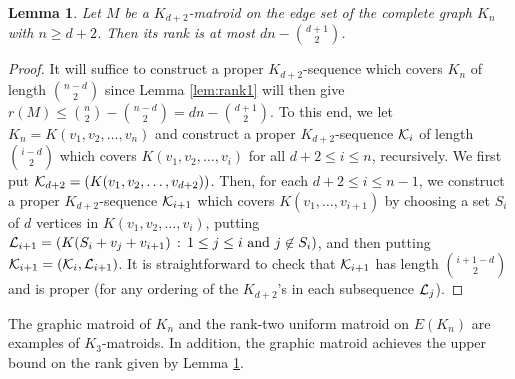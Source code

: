 \documentclass{daj}
\newtheorem{lemma}[thm]{Lemma}\theoremstyle{plain}
\begin{document}
\begin{lemma}\label{lem:upper_bound}
Let $M$ be a $K_{d+2}$-matroid on the edge set of the complete graph $K_n$ with $n\geq d+2$.
Then its rank is at most $dn-{d+1 \choose 2}$.
\end{lemma}
\begin{proof} It will suffice to construct a proper $K_{d+2}$-sequence which covers $K_n$ of length ${{n-d}\choose{2}}$ since Lemma \ref{lem:rank1} will then give $r(M)\leq {{n}\choose{2}}-{{n-d}\choose{2}}=dn-{{d+1}\choose{2}}$. To this end, we let $K_n=K(v_1,v_2,\ldots,v_n)$ and construct a proper $K_{d+2}$-sequence ${\cal K}_i$ of length ${{i-d}\choose{2}}$ which covers $K(v_1,v_2,\ldots, v_i)$ for all $d+2\leq i\leq n$, recursively.
We first put ${\cal K}_{d+2}=(K(v_1,v_2,\ldots,v_{d+2}))$. Then, for each $d+2\leq i\leq n-1$, we construct  a proper $K_{d+2}$-sequence ${\cal K}_{i+1}$ which covers $K(v_1,\dots, v_{i+1})$ by choosing a set $S_{i}$ of $d$ vertices in $K(v_1,v_2,\ldots, v_i)$, putting ${\cal L}_{i+1}=(K(S_i+v_j+v_{i+1})\,:\,1\leq j\leq i \mbox{ and }j\not\in S_i)$, and then putting
${\cal K}_{i+1}=({\cal K}_{i},{\cal L}_{i+1})$.
It is straightforward to check that ${\cal K}_{i+1}$ has length ${{i+1-d}\choose{2}}$ and is proper (for any ordering of the $K_{d+2}$'s in each subsequence ${\cal L}_j$).
\end{proof}

The graphic matroid of $K_n$ and the rank-two uniform matroid on $E(K_n)$ are examples of $K_3$-matroids. In addition, the graphic matroid achieves the upper bound on the rank given by  Lemma \ref{lem:upper_bound}.
\end{document}
